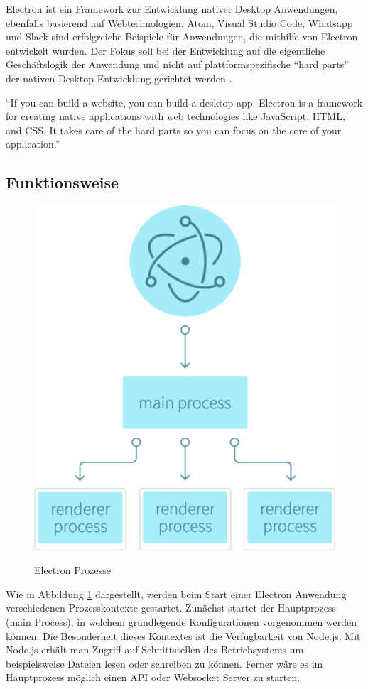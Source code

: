 Electron ist ein Framework zur Entwicklung nativer Desktop Anwendungen, ebenfalls basierend auf Webtechnologien.
Atom, Visual Studio Code, Whatsapp und Slack sind erfolgreiche Beispiele für Anwendungen, die mithilfe von Electron
entwickelt wurden.
Der Fokus soll bei der Entwicklung auf die eigentliche Geschäftslogik der Anwendung und nicht auf plattformspezifische
``hard parts'' der nativen Desktop Entwicklung gerichtet werden \cite{Elect57:online}.

\vspace{0.3cm}
``If you can build a website, you can build a desktop app. Electron is a framework for creating native applications
with web technologies like JavaScript, HTML, and CSS. It takes care of the hard parts so you can focus on the core of
your application.''
\cite{Elect57:online}

\subsection{Funktionsweise}
\label{sec:functionsweise}

\begin{figure}[htb]
 \centering
 \includegraphics[width=0.6\linewidth]{kapitel3/electron-context.png}
 \caption{Electron Prozesse}\cite{Build58:online}
\label{fig:electronprozess}
\end{figure}

Wie in Abbildung \ref{fig:electronprozess} dargestellt, werden beim Start einer
Electron Anwendung verschiedenen Prozesskontexte gestartet.
Zunächst startet der Hauptprozess (main Process), in welchem grundlegende Konfigurationen vorgenommen werden können.
Die Besonderheit dieses Kontextes ist die Verfügbarkeit von Node.js.
Mit Node.js erhält man Zugriff auf Schnittstellen des Betriebsystems um beispielsweise Dateien lesen oder schreiben zu können.
Ferner wäre es im Hauptprozess möglich einen API oder Websocket Server zu starten.

